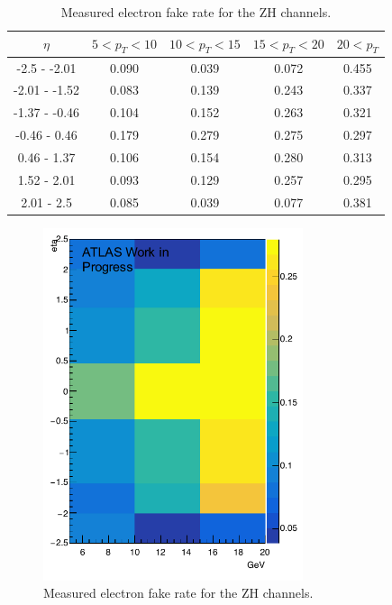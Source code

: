 \begin{table}[htb!]
    \centering
    \begin{tabular}{|c|c|c|c|c|}
    \hline
    $\eta$ & $5<p_T<10$ & $10<p_T<15$ & $15<p_T<20$ & $20<p_T$ \\
    \hline
    -2.5 - -2.01 & 0.090 & 0.039 & 0.072 & 0.455 \\
    -2.01 - -1.52 & 0.083 & 0.139 & 0.243 & 0.337 \\
    -1.37 - -0.46 & 0.104 & 0.152 & 0.263 & 0.321\\
    -0.46 - 0.46 & 0.179 & 0.279 & 0.275 & 0.297\\
    0.46 - 1.37 & 0.106 & 0.154 & 0.280 & 0.313\\
    1.52 - 2.01 & 0.093 & 0.129 & 0.257 & 0.295\\
    2.01 - 2.5 & 0.085 & 0.039 & 0.077 & 0.381\\
    \hline
    \end{tabular}
    \caption{Measured electron fake rate for the ZH channels.}
    \label{tab:zh_frs}
\end{table}

\begin{figure}[htb!]
    \centering
    \includegraphics[width=3in]{figures/chapter7/data17_zh_frs.pdf}
    \caption{Measured electron fake rate for the ZH channels.}
    \label{fig:zh_frs}
\end{figure}

